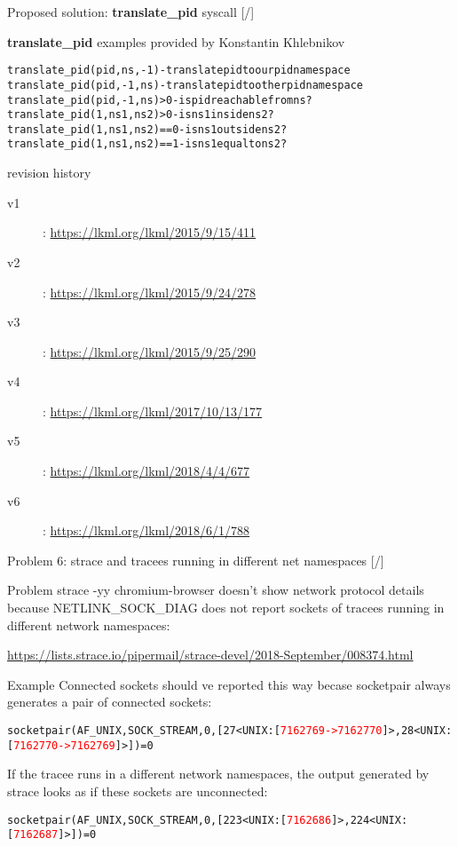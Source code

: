 \documentclass[unicode,aspectratio=169]{beamer}
\begin{document}
\begin{frame}[fragile]{Proposed solution: \textbf{translate\_pid} syscall \hfill [\insertframenumber/\inserttotalframenumber]}
\begin{block}{\textbf{translate\_pid} examples provided by Konstantin Khlebnikov}
\begin{alltt}
translate_pid(pid, ns, -1)      - translate pid to our pid namespace
translate_pid(pid, -1, ns)      - translate pid to other pid namespace
translate_pid(pid, -1, ns) > 0  - is pid reachable from ns?
translate_pid(1, ns1, ns2) > 0  - is ns1 inside ns2?
translate_pid(1, ns1, ns2) == 0 - is ns1 outside ns2?
translate_pid(1, ns1, ns2) == 1 - is ns1 equal to ns2?
\end{alltt}
\end{block}

\begin{block}{revision history}
\scriptsize
\begin{description}
\item[v1]: \url{https://lkml.org/lkml/2015/9/15/411}
\item[v2]: \url{https://lkml.org/lkml/2015/9/24/278}
\item[v3]: \url{https://lkml.org/lkml/2015/9/25/290}
\item[v4]: \url{https://lkml.org/lkml/2017/10/13/177}
\item[v5]: \url{https://lkml.org/lkml/2018/4/4/677}
\item[v6]: \url{https://lkml.org/lkml/2018/6/1/788}
\end{description}
\end{block}
\end{frame}

\begin{frame}{Problem 6: strace and tracees running in different net namespaces \hfill [\insertframenumber/\inserttotalframenumber]}
\small
\begin{block}{Problem}
strace -yy chromium-browser doesn't show network protocol details
because NETLINK\_SOCK\_DIAG does not report sockets of tracees running in different network namespaces:

\url{https://lists.strace.io/pipermail/strace-devel/2018-September/008374.html}
\end{block}

\begin{block}{Example}
Connected sockets should ve reported this way becase socketpair always generates a pair of connected sockets:
\begin{alltt}
socketpair(AF\_UNIX, SOCK\_STREAM, 0, [27<UNIX:[\textcolor{red}{7162769->7162770}]>, 28<UNIX:[\textcolor{red}{7162770->7162769}]>]) = 0
\end{alltt}

If the tracee runs in a different network namespaces, the output generated by strace looks as if these sockets are unconnected:
\begin{alltt}
socketpair(AF\_UNIX, SOCK\_STREAM, 0, [223<UNIX:[\textcolor{red}{7162686}]>, 224<UNIX:[\textcolor{red}{7162687}]>]) = 0
\end{alltt}
\end{block}
\end{frame}
\end{document}
